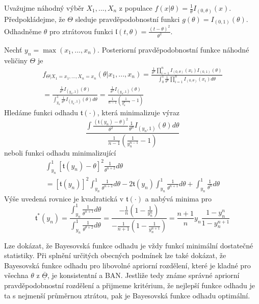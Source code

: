 \begin{example}
Uvažujme náhodný výběr $X_1, ..., X_n$ z populace $f(x|\theta) = \frac{1}{\theta}I_{(0, \theta)}(x)$. Předpokládejme, že $\Theta$ sleduje pravděpodobnostní funkci $g(\theta) = I_{(0, 1)}(\theta)$. Odhadněme $\theta$ pro ztrátovou funkci $\mathfrak{l}(t, \theta) = \frac{(t - \theta)^2}{\theta^2}$.

Nechť $y_n = \max(x_1, ..., x_n)$. Posteriorní pravděpodobnostní funkce náhodné veličiny $\Theta$ je
\begin{gather*}
f_{\Theta|X_1 = x_1, ..., X_n = x_n}(\theta|x_1, ..., x_n) = \frac{\frac{1}{\theta^n}\prod_{i = 1}^n I_{(0, \theta)}(x_i)I_{(0, 1)}(\theta)}{\int_0^1 \frac{1}{\theta^n}\prod_{i = 1}^n I_{(0, \theta)}(x_i)d \theta}\\
= \frac{\frac{1}{\theta^n}I_{(y_n, 1)}(\theta)}{\int_{y_n}^1 \frac{1}{\theta^n}I_{(y_n, 1)}(\theta)d \theta} = \frac{\frac{1}{\theta^n}I_{(y_n, 1)}(\theta)}{\frac{1}{n -1}\left(\frac{1}{y_n^{n-1}} - 1\right)}
\end{gather*}
Hledáme funkci odhadu $\mathfrak{t}(\cdot)$, která minimalizuje výraz
\begin{equation*}
\frac{\int \frac{(\mathfrak{t}(y_n) - \theta)^2}{\theta^2} \frac{1}{\theta^n}I_{(y_n, 1)}(\theta) d \theta}{\frac{1}{n - 1}\left(\frac{1}{y_n^{n-1}} - 1\right)}
\end{equation*}
neboli funkci odhadu minimalizující
\begin{gather*}
\int_{y_n}^1 [\mathfrak{t}(y_n) - \theta]^2 \frac{1}{\theta^{n + 2}}d \theta\\
= [\mathfrak{t}(y_n)]^2 \int_{y_n}^1 \frac{1}{\theta^{n + 2}}d \theta - 2 \mathfrak{t}(y_n) \int_{y_n}^1 \frac{1}{\theta^{n + 1}} d \theta + \int_{y_n}^1 \frac{1}{\theta^n}d \theta 
\end{gather*}
Výše uvedená rovnice je kvadratická v $\mathfrak{t}(\cdot)$ a nabývá minima pro
\begin{equation*}
\mathfrak{t}^*(y_n) = \frac{\int_{y_n}^1 \frac{1}{\theta^{n+1}}d \theta}{\int_{y_n}^1 \frac{1}{\theta^{\theta + 2}} d \theta} = \frac{-\frac{1}{n}\left(1 - \frac{1}{y_n^n}\right)}{-\frac{1}{n + 1}\left(1 - \frac{1}{y_n^{n+1}}\right)} = \frac{n + 1}{n}y_n \frac{1 - y_n^n}{1 - y_n^{n + 1}}
\end{equation*}
\end{example}

Lze dokázat, že Bayesovská funkce odhadu je vždy funkcí minimální dostatečné statistiky. Při splnění určitých obecných podmínek lze také dokázat, že Bayesovská funkce odhadu pro libovolné apriorní rozdělení, které je kladné pro všechna $\theta$ z $\overline{\underline{\Theta}}$, je konsistentní a BAN. Jestliže tedy známe správné apriorní pravděpodobnostní rozdělení a přijmeme kritérium, že nejlepší funkce odhadu je ta s nejmenší průměrnou ztrátou, pak je Bayesovská funkce odhadu optimální.

